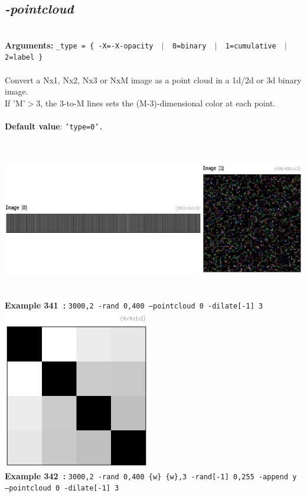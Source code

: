 \documentclass[a4paper,11pt,twoside]{book}
\begin{document}
\subsection{\emph{-pointcloud} }\vspace*{-0.5em}
~\\\textbf{Arguments: } 
{\small \texttt{\_type = \{ -X=-X-opacity ~$|$~ 0=binary ~$|$~ 1=cumulative ~$|$~ 2=label \}}}\\~\\
Convert a Nx1, Nx2, Nx3 or NxM image as a point cloud in a 1d/2d or 3d binary image.
~\\If 'M'$>$3, the 3-to-M lines sets the (M-3)-dimensional color at each point.
~\\~\\\textbf{Default value}: {\small \texttt{'type=0'.}}
\begin{center}\includegraphics[keepaspectratio=true,height=7cm,width=\textwidth]{img/gmic_def341.jpg}\\
{\footnotesize \textbf{Example 341~:} \texttt{3000,2 -rand 0,400 --pointcloud 0 -dilate[-1] 3}}
\\\includegraphics[keepaspectratio=true,height=7cm,width=\textwidth]{img/gmic_def342.jpg}\\
{\footnotesize \textbf{Example 342~:} \texttt{3000,2 -rand 0,400 \{w\} \{w\},3 -rand[-1] 0,255 -append y --pointcloud 0 -dilate[-1] 3}}
\end{center}
\end{document}
